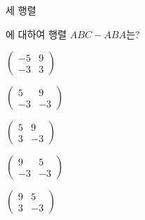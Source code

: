 세 행렬\par\smallskip{}\par\smallskip\noindent 에 대하여 행렬 $ABC-ABA$는?
\begin{choicesii}{\rule[-3.0ex]{0pt}{8.0ex}$\begin{pmatrix} -5 & 9 \\ -3 & 3 \end{pmatrix}$}{\rule[-3.0ex]{0pt}{8.0ex}$\begin{pmatrix} 5 & 9 \\ -3 & -3 \end{pmatrix}$}{\rule[-3.0ex]{0pt}{8.0ex}$\begin{pmatrix} 5 & 9 \\ 3 & -3 \end{pmatrix}$}{\rule[-3.0ex]{0pt}{8.0ex}$\begin{pmatrix} 9 & 5 \\ -3 & -3 \end{pmatrix}$}{\rule[-3.0ex]{0pt}{8.0ex}$\begin{pmatrix} 9 & 5 \\ 3 & -3 \end{pmatrix}$}\end{choicesii}
